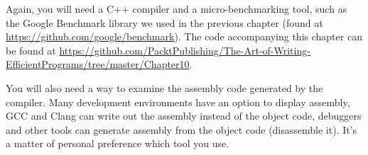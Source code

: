 Again, you will need a C++ compiler and a micro-benchmarking tool, such as the Google Benchmark library we used in the previous chapter (found at \url{https://github.com/google/benchmark}). The code accompanying this chapter can be found at \url{https://github.com/PacktPublishing/The-Art-of-Writing-EfficientPrograms/tree/master/Chapter10}.

You will also need a way to examine the assembly code generated by the compiler. Many development environments have an option to display assembly, GCC and Clang can write out the assembly instead of the object code, debuggers and other tools can generate assembly from the object code (disassemble it). It's a matter of personal preference which tool you use.